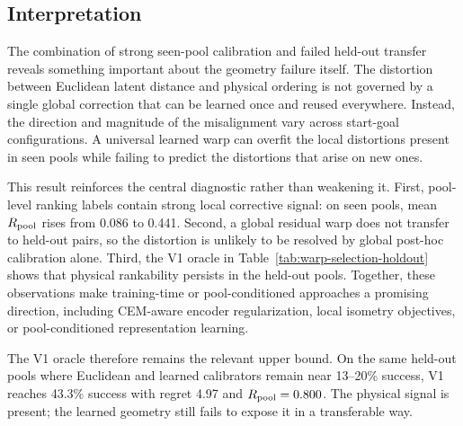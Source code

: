 \subsection{Interpretation}

The combination of strong seen-pool calibration and failed held-out transfer reveals something important about the geometry failure itself. The distortion between Euclidean latent distance and physical ordering is not governed by a single global correction that can be learned once and reused everywhere. Instead, the direction and magnitude of the misalignment vary across start-goal configurations. A universal learned warp can overfit the local distortions present in seen pools while failing to predict the distortions that arise on new ones.

This result reinforces the central diagnostic rather than weakening it. First, pool-level ranking labels contain strong local corrective signal: on seen pools, mean $R_\text{pool}$ rises from 0.086 to 0.441. Second, a global residual warp does not transfer to held-out pairs, so the distortion is unlikely to be resolved by global post-hoc calibration alone. Third, the V1 oracle in Table~\ref{tab:warp-selection-holdout} shows that physical rankability persists in the held-out pools. Together, these observations make training-time or pool-conditioned approaches a promising direction, including CEM-aware encoder regularization, local isometry objectives, or pool-conditioned representation learning.

The V1 oracle therefore remains the relevant upper bound. On the same held-out pools where Euclidean and learned calibrators remain near 13--20\% success, V1 reaches 43.3\% success with regret 4.97 and $R_\text{pool}=0.800$. The physical signal is present; the learned geometry still fails to expose it in a transferable way.
